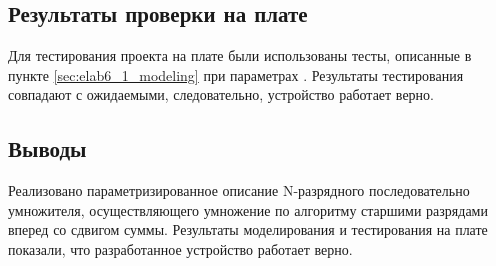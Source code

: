 \subsection{Результаты проверки на плате}

Для тестирования проекта на плате были использованы тесты, описанные в пункте \ref{sec:elab6_1_modeling} при параметрах . Результаты тестирования совпадают с ожидаемыми, следовательно, устройство работает верно.

\subsection{Выводы}

Реализовано параметризированное описание N-разрядного последовательно умножителя, осуществляющего умножение по алгоритму старшими разрядами вперед со сдвигом суммы. Результаты моделирования и тестирования на плате показали, что разработанное устройство работает верно.

